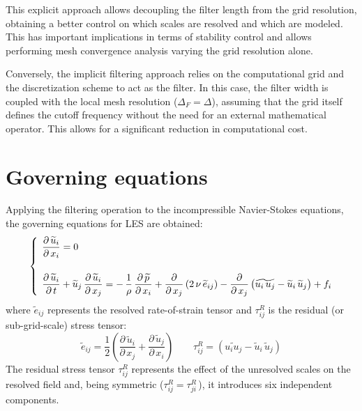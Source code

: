 \documentclass[12pt, a4paper, twoside, openright]{book}
\begin{document}
This explicit approach allows decoupling the filter length from the grid resolution, obtaining a better control on which scales are resolved and which are modeled. This has important implications in terms of stability control and allows performing mesh convergence analysis varying the grid resolution alone.

Conversely, the implicit filtering approach relies on the computational grid and the discretization scheme to act as the filter. In this case, the filter width is coupled with the local mesh resolution ($\Delta_F = \Delta$), assuming that the grid itself defines the cutoff frequency without the need for an external mathematical operator. This allows for a significant reduction in computational cost.

\section{Governing equations}

Applying the filtering operation to the incompressible Navier-Stokes equations, the governing equations for LES are obtained:
\begin{equation}
	\label{eq:les-equations}
	\left\{
	\hspace{0.15cm}
	\begin{aligned}
		 & \frac{\partial \, \widetilde{u}_i}{\partial \, x_i} = 0                                                                                                                                                                                                                                                                                                                                              \\[12pt]
		 & \frac{\partial \, \widetilde{u}_i}{\partial \, t} + \widetilde{u}_j \, \frac{\partial \, \widetilde{u}_i}{\partial \, x_j} = - \, \frac{1}{\rho} \, \frac{\partial \, \widetilde{p}}{\partial \, x_i} + \frac{\partial}{\partial \, x_j} \left( 2 \, \nu \, \widetilde{e}_{ij} \right) - \frac{\partial}{\partial \, x_j} \left( \widetilde{u_i \, u_j} - \widetilde{u}_i \, \widetilde{u}_j \right) + f_i
	\end{aligned}
	\right.
\end{equation}
where $\widetilde{e}_{ij}$ represents the resolved rate-of-strain tensor and $\tau_{ij}^R$ is the residual (or sub-grid-scale) stress tensor:
\begin{equation}
	\widetilde{e}_{ij} = \frac{1}{2} \left( \frac{\partial \, \widetilde{u}_i}{\partial \, x_j} + \frac{\partial \, \widetilde{u}_j}{\partial \, x_i} \right)
	\qquad
	\tau_{ij}^R = \left( \widetilde{u_i u_j} - \widetilde{u}_i \, \widetilde{u}_j \right)
\end{equation}
The residual stress tensor $\tau_{ij}^R$ represents the effect of the unresolved scales on the resolved field and, being symmetric ($\tau_{ij}^R = \tau_{ji}^R \,$), it introduces six independent components.
\end{document}
